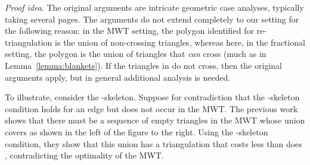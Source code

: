 \documentclass[final]{siamltex}
\newenvironment{proofidea}{\par{\it Proof idea}. \ignorespaces}{}
\begin{document}
\begin{proofidea}
  The original arguments are intricate geometric case analyses, typically taking several
  pages.  The arguments do not extend completely to our setting for the following reason:
  in the MWT setting, the polygon  identified for re-triangulation 
  is the union of non-crossing triangles,
  whereas here, in the fractional setting, 
  the polygon  is the union of triangles that {\em can} cross
  (much as in Lemma~\ref{lemma:blankets}).
  If the triangles in  do not cross, then the original arguments apply,
  but in general additional analysis is needed.
    To illustrate, consider the -skeleton.
    Suppose for contradiction that the -skeleton condition
    holds for an edge  but  does not occur in the MWT.
    The previous work \cite{keil1994computing,cheng1996approaching} 
    shows that there must be
    a sequence  of empty triangles in the MWT whose union 
    covers  as shown in the left of the figure to the right.
    Using the -skeleton condition, they show that this union 
    has a triangulation that costs less than does , 
    contradicting the optimality of the MWT.


\end{window}
\end{proofidea}
\end{document}
